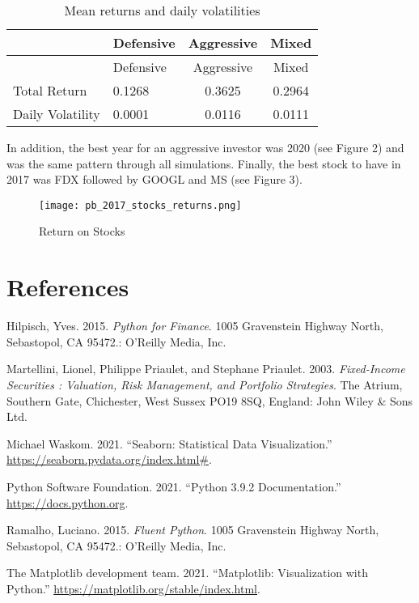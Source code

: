 \documentclass[
  11pt,
]{article}
\begin{document}
\begin{longtable}[]{@{}llcc@{}}
\caption{\label{tab:unnamed-chunk-6}Mean returns and daily volatilities}\tabularnewline
\toprule
& Defensive & Aggressive & Mixed\tabularnewline
\midrule
\endfirsthead
\toprule
& Defensive & Aggressive & Mixed\tabularnewline
\midrule
\endhead
Total Return & 0.1268 & 0.3625 & 0.2964\tabularnewline
Daily Volatility & 0.0001 & 0.0116 & 0.0111\tabularnewline
\bottomrule
\end{longtable}

In addition, the best year for an aggressive investor was 2020 (see Figure 2) and was the same pattern through all simulations. Finally, the best stock to have in 2017 was FDX followed by GOOGL and MS (see Figure 3).

\begin{figure}
\centering
\texttt{[image: pb\_2017\_stocks\_returns.png]}
\caption{Return on Stocks}
\end{figure}

\newpage

\hypertarget{references}{%
\section*{References}\label{references}}

\hypertarget{refs}{}
\leavevmode\hypertarget{ref-finpy}{}%
Hilpisch, Yves. 2015. \emph{Python for Finance}. 1005 Gravenstein Highway North, Sebastopol, CA 95472.: O'Reilly Media, Inc.

\leavevmode\hypertarget{ref-secur}{}%
Martellini, Lionel, Philippe Priaulet, and Stephane Priaulet. 2003. \emph{Fixed-Income Securities : Valuation, Risk Management, and Portfolio Strategies}. The Atrium, Southern Gate, Chichester, West Sussex PO19 8SQ, England: John Wiley \& Sons Ltd.

\leavevmode\hypertarget{ref-seaborn}{}%
Michael Waskom. 2021. ``Seaborn: Statistical Data Visualization.'' \url{https://seaborn.pydata.org/index.html\#}.

\leavevmode\hypertarget{ref-docpy}{}%
Python Software Foundation. 2021. ``Python 3.9.2 Documentation.'' \url{https://docs.python.org}.

\leavevmode\hypertarget{ref-fpy}{}%
Ramalho, Luciano. 2015. \emph{Fluent Python}. 1005 Gravenstein Highway North, Sebastopol, CA 95472.: O'Reilly Media, Inc.

\leavevmode\hypertarget{ref-matplot}{}%
The Matplotlib development team. 2021. ``Matplotlib: Visualization with Python.'' \url{https://matplotlib.org/stable/index.html}.
\end{document}
